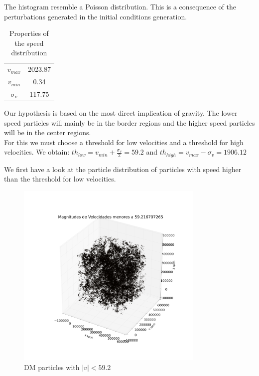 \documentclass[12pt]{article}
\begin{document}
The histogram resemble a Poisson distribution. This is a consequence of the perturbations generated in the initial conditions generation. 

\begin{table}[ht]
    \centering
    \begin{tabular}{|c|c|}
        $v_{max}$ & 2023.87 \\
        $v_{min}$ & 0.34\\
        $\sigma_{v}$ & 117.75 
    \end{tabular}
    \caption{Properties of the speed distribution}
    \label{tab:vel}
\end{table}
\FloatBarrier


Our hypothesis is based on the most direct implication of gravity. The lower speed
particles will mainly be in the border regions and the higher speed particles
will be in the center regions. \\

For this we must choose a threshold for low velocities and a threshold for high velocities. 
We obtain: $th_{low} = v_{min} + \frac{\sigma_{v}}{2} = 59.2$ and $th_{high} = v_{max}  - \sigma_{v} = 1906.12 $

We first have a look at the particle distribution of particles with speed higher than the
threshold for low velocities.\\
\begin{figure}[ht]
\begin{center}
\includegraphics[width=0.8\textwidth]{graphs/pos_3d_vel_menor_s_smaller.png} %
\caption{DM particles with $|v| < 59.2 $}
\label{fg:3d_thresh_low}
\end{center}
\end{figure}
\FloatBarrier
\end{document}
